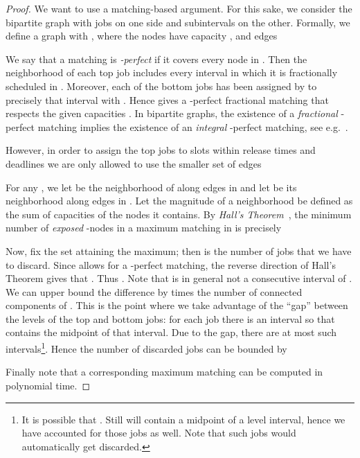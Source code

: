 \documentclass[11pt,letterpaper,oneside,english]{article}
\theoremstyle{theorem}
\begin{document}
\begin{proof}
We want to use a matching-based argument.
For this sake, we consider the bipartite graph with jobs on one side and subintervals on the other. Formally, we define a graph  with ,  where the nodes  have capacity , and edges 

We say that a matching  is \emph{-perfect} if it covers every node in .
Then the neighborhood of each top job includes every interval in which it is fractionally scheduled in . Moreover, each of the bottom jobs  has been 
assigned by  to precisely that interval  with . Hence  gives a
-perfect fractional matching that respects the given capacities .
In bipartite graphs, the existence of a \emph{fractional} -perfect matching implies
the existence of an \emph{integral} -perfect matching, see e.g.~\cite{CombinatorialOptimizationBook-Schrijver-2003}. 

However, in order to assign the top jobs to slots within release times and deadlines
we are only allowed to use the smaller set of edges

For any , we let  be the neighborhood of  along edges in  and let  be its neighborhood along edges in . Let the magnitude of a neighborhood  be defined as the sum of capacities of the nodes it contains.
By \emph{Hall's Theorem}~\cite{CombinatorialOptimizationBook-Schrijver-2003}, the minimum number of \emph{exposed} -nodes in a maximum matching in  is precisely

Now, fix the set  attaining the maximum; then 
is the number of jobs that we have to discard. Since  allows for a 
-perfect matching, the reverse direction of Hall's Theorem gives that
. Thus .
Note that  is in general not a consecutive interval of .
We can upper bound the difference  by 
times the number of connected components of . 
This is the point where we take advantage of the ``gap'' between the levels of the top and bottom jobs: for each job  there is an interval  so that 
contains the midpoint of that interval. Due to the gap, there are at most  such intervals\footnote{It is possible that . Still  will contain a midpoint of a level  interval, hence we have accounted for those jobs as well. Note that such jobs would automatically get discarded.}. Hence the number of discarded jobs can be bounded by

Finally note that a corresponding maximum matching can be computed in polynomial time.
\end{proof}
\end{document}
